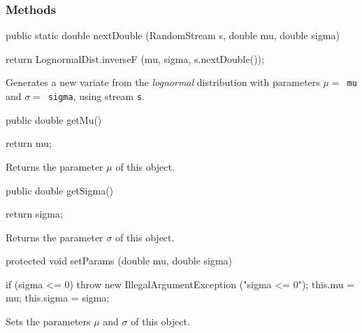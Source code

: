 \subsubsection* {Methods}
\begin{code}

   public static double nextDouble (RandomStream s, double mu, double sigma)\begin{hide} {
      return LognormalDist.inverseF (mu, sigma, s.nextDouble());
   }\end{hide}
\end{code}
\begin{tabb}  Generates a new variate from the {\em lognormal\/}
    distribution with parameters $\mu = $~\texttt{mu} and
    $\sigma = $~\texttt{sigma}, using stream \texttt{s}.
\end{tabb}
\begin{code}      

   public double getMu()\begin{hide} {
      return mu;
   }\end{hide}
\end{code}
  \begin{tabb}  Returns the parameter $\mu$ of this object.
  \end{tabb}
\begin{code}

   public double getSigma()\begin{hide} {
      return sigma;
   }\end{hide}
\end{code}
  \begin{tabb}  Returns the parameter $\sigma$ of this object.
  \end{tabb}
\begin{hide}\begin{code}

   protected void setParams (double mu, double sigma)\begin{hide} {
      if (sigma <= 0)
         throw new IllegalArgumentException ("sigma <= 0");
      this.mu = mu;
      this.sigma = sigma;
   }\end{hide}
\end{code}
  \begin{tabb}  Sets the parameters $\mu$ and $\sigma$ of this object.
  \end{tabb}
\begin{code}
}
\end{code}
\end{hide}
